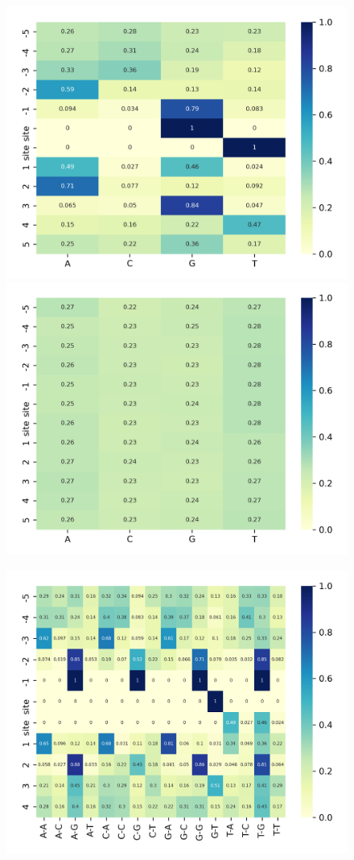 \documentclass[journal,twoside]{IEEEtran}
\begin{document}
\begin{figure}[htbp]
\centerline{\includegraphics[scale=0.6]{Pics/ssheatmap_donor.png}
    \includegraphics[scale=0.6]{Pics/ssheatmap_neg.png}}
\centerline{\includegraphics[scale=0.6]{Pics/asheatmap_donor.png}
}
\end{figure}
\end{document}
